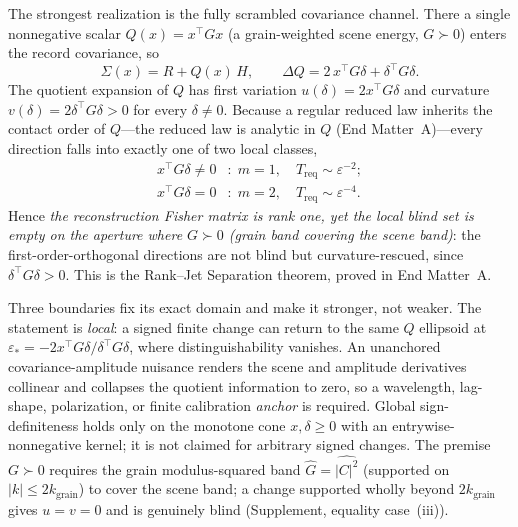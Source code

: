 \documentclass[aps,prl,reprint,groupedaddress,superscriptaddress,floatfix]{revtex4-2}
\newcommand{\Treq}{T_{\mathrm{req}}}
\newcommand{\eps}{\varepsilon}
\begin{document}
The strongest realization is the fully scrambled covariance channel. There a
single nonnegative scalar $Q(x)=x^{\!\top}Gx$ (a grain-weighted scene energy,
$G\succ0$) enters the record covariance, so
%
\begin{equation}
\Sigma(x)=R+Q(x)\,H,\qquad
\Delta Q = 2\,x^{\!\top}G\delta + \delta^{\!\top}G\delta .
\label{eq:Q}
\end{equation}
%
The quotient expansion of $Q$ has first variation $u(\delta)=2x^{\!\top}G\delta$
and curvature $v(\delta)=2\delta^{\!\top}G\delta>0$ for every $\delta\neq0$.
Because a regular reduced law inherits the contact order of $Q$---the reduced
law is analytic in $Q$ (End Matter~A)---every direction
falls into exactly one of two local classes,
%
\begin{equation}
\begin{aligned}
x^{\!\top}G\delta\neq0 &:\; m=1,\quad \Treq\sim\eps^{-2};\\[2pt]
x^{\!\top}G\delta=0 &:\; m=2,\quad \Treq\sim\eps^{-4}.
\end{aligned}
\label{eq:classes}
\end{equation}
%
Hence \emph{the reconstruction Fisher matrix is rank one, yet the local blind set
is empty on the aperture where $G\succ0$ (grain band covering the scene band)}:
the first-order-orthogonal directions are not blind but
curvature-rescued, since $\delta^{\!\top}G\delta>0$. This is the Rank--Jet
Separation theorem, proved in End Matter~A.

Three boundaries fix its exact domain and make it stronger, not weaker. The
statement is \emph{local}: a signed finite change can return to the same $Q$
ellipsoid at $\eps_\ast=-2x^{\!\top}G\delta/\delta^{\!\top}G\delta$, where
distinguishability vanishes. An unanchored covariance-amplitude nuisance renders
the scene and amplitude derivatives collinear and collapses the quotient
information to zero, so a wavelength, lag-shape, polarization, or finite
calibration \emph{anchor} is required. Global sign-definiteness holds only on the
monotone cone $x,\delta\ge0$ with an entrywise-nonnegative kernel; it is not
claimed for arbitrary signed changes. The premise $G\succ0$ requires the grain
modulus-squared band $\hat{G}=\widehat{|C|^2}$ (supported on
$|k|\le2k_{\mathrm{grain}}$) to cover the scene band; a change supported wholly
beyond $2k_{\mathrm{grain}}$ gives $u=v=0$ and is genuinely blind
(Supplement, equality case~(iii)).

\end{document}
